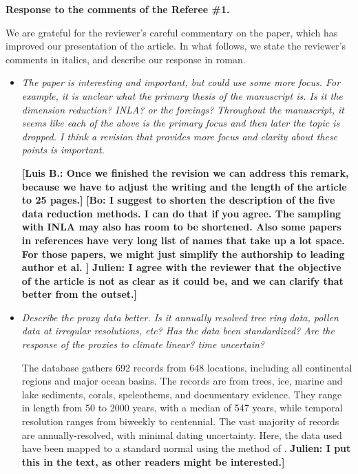\documentclass[11pt]{article}
\newcommand{\lb}[1]{\color{ForestGreen}\textbf{[Luis B.: #1]}\normalcolor}
\newcommand{\bl}[1]{\color{red}\textbf{[Bo: #1]}\normalcolor}
\newcommand{\jeg}[1]{\color{blue}\textbf{Julien: #1]}\normalcolor}
\begin{document}
\begin{center}
  {\Large \textbf{Response to the comments of the Referee \#1.}}
\end{center}

We are grateful for the reviewer's careful commentary on the paper, which has improved
our presentation of the article. In what follows, we state the reviewer's
comments in italics, and describe our response in roman.

\begin{itemize}
\item \textit{The paper is interesting and important, but could use some more
focus. For example, it is unclear what the primary thesis of the manuscript is.
Is it the dimension reduction? INLA? or the forcings? Throughout the manuscript,
it seems like each of the above is the primary focus and then later the topic is
dropped. I think a revision that provides more focus and clarity about these
points is important.
}

  \lb{Once we finished the revision we can address this remark, because we have
    to adjust the writing and the length of the article to 25 pages.}
  \bl{I suggest to shorten the description of the five data reduction methods. I can do that if you agree. The sampling with INLA may also has room to be shortened. Also some papers in references have very long list of names that take up a lot space. For those papers, we might just simplify the authorship to leading author et al. }
  \jeg{I agree with the reviewer that the objective of the article is not as clear as it could be, and we can clarify that better from the outset.}
  
\item \textit{Describe the proxy data better. Is it annually resolved tree ring
    data, pollen data at irregular resolutions, etc? Has the data been
    standardized? Are the response of the proxies to climate linear? time
    uncertain?}

  The database gathers 692 records from 648 locations, including all continental regions and major ocean basins. The records are from trees, ice, marine and lake sediments, corals, speleothems, and documentary evidence. They range in length from 50 to 2000 years, with a median of 547 years, while temporal resolution ranges from biweekly to centennial.
  The vast majority of records are annually-resolved, with minimal dating uncertainty. Here, the data used have been mapped to a standard normal using the method of \cite{vanAlbada2007}. \jeg{I put this in the text, as other readers might be interested.}
  

\end{itemize}
\end{document}
